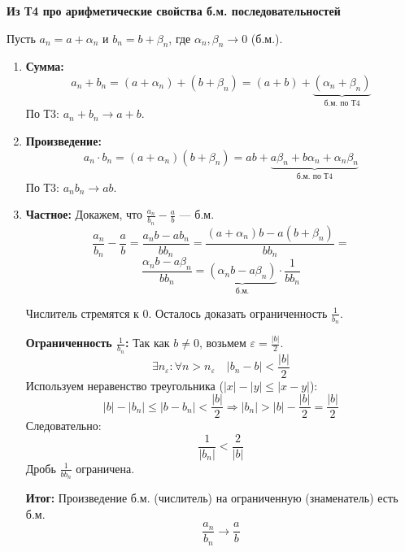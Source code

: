 \begin{tcolorbox}[title=Доказательство Т5: Арифметические свойства предела]
	\textbf{Из Т4 про арифметические свойства б.м. последовательностей}
	
	Пусть $a_n = a + \alpha_n$ и $b_n = b + \beta_n$, где $\alpha_n, \beta_n \to 0$ (б.м.).
	
	\begin{enumerate}
		\item \textbf{Сумма:}
		$$ a_n + b_n = (a + \alpha_n) + (b + \beta_n) = (a + b) + \underbrace{(\alpha_n + \beta_n)}_{\text{б.м. по Т4}} $$
		По Т3: $a_n + b_n \to a + b$.
		
		\item \textbf{Произведение:}
		$$ a_n \cdot b_n = (a + \alpha_n)(b + \beta_n) = ab + \underbrace{a\beta_n + b\alpha_n + \alpha_n\beta_n}_{\text{б.м. по Т4}} $$
		По Т3: $a_n b_n \to ab$.
		
		\item \textbf{Частное:} Докажем, что $\frac{a_n}{b_n} - \frac{a}{b}$ — б.м.
			\[ \frac{a_n}{b_n} - \frac{a}{b} = \frac{a_n b - a b_n}{b b_n} = \frac{(a+\alpha_n)b - a(b+\beta_n)}{b b_n} = \]
			\[ \frac{\alpha_n b - a\beta_n}{b b_n} = \underbrace{(\alpha_n b - a\beta_n)}_{\text{б.м.}} \cdot \frac{1}{b b_n} \]
		
		Числитель стремятся к 0. Осталось доказать ограниченность $\frac{1}{b_n}$.
		
		\textbf{Ограниченность $\frac{1}{b_n}$:}
		Так как $b \neq 0$, возьмем $\varepsilon = \frac{|b|}{2}$.
		$$ \exists n_\varepsilon: \forall n > n_\varepsilon \quad |b_n - b| < \frac{|b|}{2} $$
		Используем неравенство треугольника ($|x| - |y| \le |x-y|$):
		$$ |b| - |b_n| \le |b - b_n| < \frac{|b|}{2} \Rightarrow |b_n| > |b| - \frac{|b|}{2} = \frac{|b|}{2} $$
		Следовательно:
		$$ \frac{1}{|b_n|} < \frac{2}{|b|} $$
		Дробь $\frac{1}{b b_n}$ ограничена.
		
		\textbf{Итог:} Произведение б.м. (числитель) на ограниченную (знаменатель) есть б.м.
		$$ \frac{a_n}{b_n} \to \frac{a}{b} $$
	\end{enumerate}
\end{tcolorbox}
